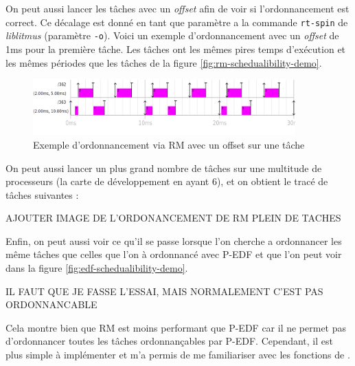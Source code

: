 On peut aussi lancer les tâches avec un \textit{offset} afin de voir si l'ordonnancement est correct. Ce décalage est donné en tant que paramètre a la commande \texttt{rt-spin} de \textit{liblitmus} (paramètre \texttt{-o}). Voici un exemple d'ordonnancement avec un \textit{offset} de 1ms pour la première tâche. Les tâches ont les mêmes pires temps d'exécution et les mêmes périodes que les tâches de la figure \ref{fig:rm-schedualibility-demo}.
\begin{figure}[H]
    \centering
    \includegraphics[width=0.9\textwidth]{Images/RM_OFFSET_SCHED.png}
    \caption{Exemple d'ordonnancement via RM avec un offset sur une tâche}
\end{figure}

On peut aussi lancer un plus grand nombre de tâches sur une multitude de processeurs (la carte de développement en ayant 6), et on obtient le tracé de tâches suivantes : 
\begin{center}
    \color{red} AJOUTER IMAGE DE L'ORDONANCEMENT DE RM PLEIN DE TACHES
\end{center}


Enfin, on peut aussi voir ce qu'il se passe lorsque l'on cherche a ordonnancer les même tâches que celles que l'on à ordonnancé avec P-EDF et que l'on peut voir dans la figure \ref{fig:edf-schedualibility-demo}.

\begin{center}
    \color{red}IL FAUT QUE JE FASSE L'ESSAI, MAIS NORMALEMENT C'EST PAS ORDONNANCABLE
\end{center}

Cela montre bien que RM est moins performant que P-EDF car il ne permet pas d'ordonnancer toutes les tâches ordonnançables par P-EDF. Cependant, il est plus simple à implémenter et m'a permis de me familiariser avec les fonctions de \litmus.


